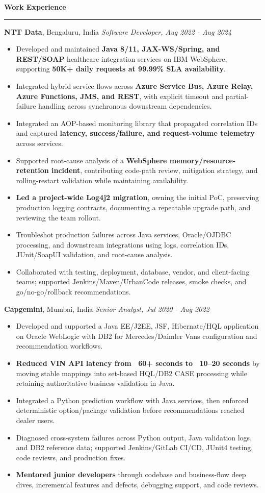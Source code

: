 \documentclass[11pt,letterpaper]{article}
\newcommand{\ressection}[1]{\Needspace{5\baselineskip}\vspace{8pt}\par\textbf{#1}\par\vspace{2pt}\hrule\vspace{5pt}}
\begin{document}
\ressection{Work Experience}
\textbf{NTT Data}, Bengaluru, India \hfill \textit{Software Developer, Aug 2022 - Aug 2024}
\begin{itemize}
  \item Developed and maintained \textbf{Java 8/11, JAX-WS/Spring, and REST/SOAP} healthcare integration services on IBM WebSphere, supporting \textbf{50K+ daily requests at 99.99\% SLA availability}.
  \item Integrated hybrid service flows across \textbf{Azure Service Bus, Azure Relay, Azure Functions, JMS, and REST}, with explicit timeout and partial-failure handling across synchronous downstream dependencies.
  \item Integrated an AOP-based monitoring library that propagated correlation IDs and captured \textbf{latency, success/failure, and request-volume telemetry} across services.
  \item Supported root-cause analysis of a \textbf{WebSphere memory/resource-retention incident}, contributing code-path review, mitigation strategy, and rolling-restart validation while maintaining availability.
  \item \textbf{Led a project-wide Log4j2 migration}, owning the initial PoC, preserving production logging contracts, documenting a repeatable upgrade path, and reviewing the team rollout.
  \item Troubleshot production failures across Java services, Oracle/OJDBC processing, and downstream integrations using logs, correlation IDs, JUnit/SoapUI validation, and root-cause analysis.
  \item Collaborated with testing, deployment, database, vendor, and client-facing teams; supported Jenkins/Maven/UrbanCode releases, smoke checks, and go/no-go/rollback recommendations.
\end{itemize}
\textbf{Capgemini}, Mumbai, India \hfill \textit{Senior Analyst, Jul 2020 - Aug 2022}
\begin{itemize}
  \item Developed and supported a Java EE/J2EE, JSF, Hibernate/HQL application on Oracle WebLogic with DB2 for Mercedes/Daimler Vans configuration and recommendation workflows.
  \item \textbf{Reduced VIN API latency from ~60+ seconds to ~10--20 seconds} by moving stable mappings into set-based HQL/DB2 CASE processing while retaining authoritative business validation in Java.
  \item Integrated a Python prediction workflow with Java services, then enforced deterministic option/package validation before recommendations reached dealer users.
  \item Diagnosed cross-system failures across Python output, Java validation logs, and DB2 reference data; supported Jenkins/GitLab CI/CD, JUnit4 testing, code reviews, and production fixes.
  \item \textbf{Mentored junior developers} through codebase and business-flow deep dives, incremental features and defects, debugging support, and code reviews.
\end{itemize}
\end{document}
